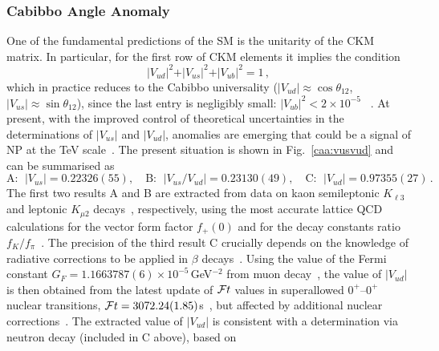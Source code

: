 \documentclass[10pt]{article}
\begin{document}
\subsubsection{Cabibbo Angle Anomaly}
\label{subsec:CAA} 
%
One of the fundamental predictions of the SM is the unitarity 
of the CKM matrix. In particular, for the first row of CKM elements it implies the condition
\begin{equation}\label{caa:unitarity} 
\vert V_{ud} \vert^2 + \vert V_{us} \vert^2 + \vert V_{ub} \vert^2 = 1  \,,
\end{equation}
which in practice reduces to the Cabibbo universality
($\vert V_{ud} \vert \approx \cos\theta_{12}$, $\vert V_{us} \vert \approx \sin\theta_{12}$),   
since the last entry is negligibly small: $\vert V_{ub} \vert^2 < 2\times 10^{-5}$ ~\cite{Zyla:2020zbs}. At present, with the improved control of theoretical uncertainties in the determinations of $\vert V_{us} \vert$ and $\vert V_{ud} \vert$, anomalies are emerging that could be a signal of NP at the TeV scale~\cite{Belfatto:2019swo,Coutinho:2019aiy,Crivellin:2020lzu,Manzari:2020eum,Grossman:2019bzp,Belfatto:2021jhf}. 
The present situation is shown in Fig.~\ref{caa:vusvud} and can be summarised as  
\begin{equation}\label{caa:ABC} 
\mathrm{A:} ~~ \vert V_{us} \vert = 0.22326(55), \quad 
\mathrm{B:} ~~ \vert V_{us}/V_{ud} \vert = 0.23130(49), \quad    
\mathrm{C:} ~~ \vert V_{ud} \vert = 0.97355(27)  \,.
\end{equation}
The first two results A and B are extracted from data on kaon 
semileptonic $K_{\ell 3}$ and leptonic $K_{\mu2}$  decays~\cite{Zyla:2020zbs}, respectively,
using the most accurate lattice QCD calculations for the vector form factor 
$f_+(0)$ and for the decay constants ratio $f_K/f_\pi$~\cite{Aoki:2019cca}. 
The precision of the third result C crucially depends on the knowledge of radiative corrections to be applied in $\beta$ decays~\cite{Marciano:2005ec,Seng:2018yzq,Seng:2018qru,Czarnecki:2019mwq,Seng:2020wjq,Hayen:2020cxh,Shiells:2020fqp}.  Using the value of the Fermi constant $G_F = 1.1663787(6)\times 10^{-5}$\,GeV$^{-2}$
from muon decay~\cite{Tishchenko:2012ie}, the value of $\vert V_{ud} \vert $ is then obtained from the latest update of ${\cal F}t$ values in superallowed $0^+$--$0^+$ nuclear transitions, ${\cal F}t=3072.24(1.85)$s~\cite{Hardy:2020qwl}, but affected by additional nuclear corrections~\cite{Hardy:2020qwl,Gorchtein:2018fxl}. The extracted value of $\vert V_{ud} \vert $ is consistent with a determination via neutron decay (included in C above), based on 
\end{document}
